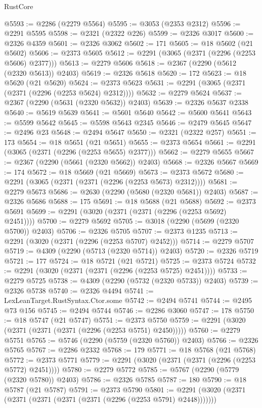 \begin{lexlean}{RustCore}
\begin{coremodule}
@5593 := @2286 (@2279 @5564)
@5595 := @3053 (@2353 @2312)
@5596 := @2291 @5595
@5598 := @2321 (@2322 @226)
@5599 := @2326 @3017
@5600 := @2326 @4359
@5601 := @2326 @3062
@5602 := 171
@5605 := @18 @5602 (@21 @5602)
@5606 := @2373 @5605
@5612 := @2291 (@3065 (@2371 (@2296 (@2253 @5606) @2377)))
@5613 := @2279 @5606
@5618 := @2367 (@2290 (@5612 (@2320 @5613)) @2403)
@5619 := @2326 @5618
@5620 := 172
@5623 := @18 @5620 (@21 @5620)
@5624 := @2373 @5623
@5631 := @2291 (@3065 (@2371 (@2371 (@2296 (@2253 @5624) @2312))))
@5632 := @2279 @5624
@5637 := @2367 (@2290 (@5631 (@2320 @5632)) @2403)
@5639 := @2326 @5637 @2338
@5640 := @5619 @5639
@5641 := @5601 @5640
@5642 := @5600 @5641
@5643 := @5599 @5642
@5645 := @5598 @5643 @2345
@5646 := @2479 @5645
@5647 := @2496 @23
@5648 := @2494 @5647
@5650 := @2321 (@2322 @257)
@5651 := 173
@5654 := @18 @5651 (@21 @5651)
@5655 := @2373 @5654
@5661 := @2291 (@3065 (@2371 (@2296 (@2253 @5655) @2377)))
@5662 := @2279 @5655
@5667 := @2367 (@2290 (@5661 (@2320 @5662)) @2403)
@5668 := @2326 @5667
@5669 := 174
@5672 := @18 @5669 (@21 @5669)
@5673 := @2373 @5672
@5680 := @2291 (@3065 (@2371 (@2371 (@2296 (@2253 @5673) @2312))))
@5681 := @2279 @5673
@5686 := @2630 (@2290 (@5680 (@2320 @5681)) @2403)
@5687 := @2326 @5686
@5688 := 175
@5691 := @18 @5688 (@21 @5688)
@5692 := @2373 @5691
@5699 := @2291 (@3020 (@2371 (@2371 (@2296 (@2253 @5692) @2451))))
@5700 := @2279 @5692
@5705 := @3018 (@2290 (@5699 (@2320 @5700)) @2403)
@5706 := @2326 @5705
@5707 := @2373 @1235
@5713 := @2291 (@3020 (@2371 (@2296 (@2253 @5707) @2452)))
@5714 := @2279 @5707
@5719 := @4309 (@2290 (@5713 (@2320 @5714)) @2403)
@5720 := @2326 @5719
@5721 := 177
@5724 := @18 @5721 (@21 @5721)
@5725 := @2373 @5724
@5732 := @2291 (@3020 (@2371 (@2371 (@2296 (@2253 @5725) @2451))))
@5733 := @2279 @5725
@5738 := @4309 (@2290 (@5732 (@2320 @5733)) @2403)
@5739 := @2326 @5738
@5740 := @2326 @4494
@5741 := LexLeanTarget.RustSyntax.Ctor.some
@5742 := @2494 @5741
@5744 := @2495 @73 @156
@5745 := @2494 @5744
@5746 := @2286 @3060
@5747 := 178
@5750 := @18 @5747 (@21 @5747)
@5751 := @2373 @5750
@5759 := @2291 (@3020 (@2371 (@2371 (@2371 (@2296 (@2253 @5751) @2450)))))
@5760 := @2279 @5751
@5765 := @5746 (@2290 (@5759 (@2320 @5760)) @2403)
@5766 := @2326 @5765
@5767 := @2286 @2332
@5768 := 179
@5771 := @18 @5768 (@21 @5768)
@5772 := @2373 @5771
@5779 := @2291 (@3020 (@2371 (@2371 (@2296 (@2253 @5772) @2451))))
@5780 := @2279 @5772
@5785 := @5767 (@2290 (@5779 (@2320 @5780)) @2403)
@5786 := @2326 @5785
@5787 := 180
@5790 := @18 @5787 (@21 @5787)
@5791 := @2373 @5790
@5801 := @2291 (@3020 (@2371 (@2371 (@2371 (@2371 (@2371 (@2296 (@2253 @5791) @2448)))))))

\end{coremodule}
\end{lexlean}
